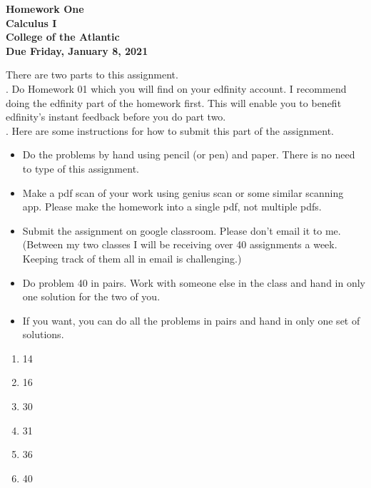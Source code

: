 \documentclass[12pt]{article}
\begin{document}
\pagestyle{empty}
 
\begin{center}
{\LARGE {\bf Homework One}}\\
\bigskip
{\Large {\bf Calculus I}}\\
\bigskip
{\Large {\bf College of the Atlantic}}\\
\bigskip
{ {\bf Due Friday, January 8, 2021}}\\ 
\end{center}
\medskip


\noindent There are two parts to this assignment.\\

.  Do Homework 01 which you will find
on your edfinity account.  I recommend doing the edfinity part of the
homework first.  This will enable you to benefit edfinity's instant
feedback before you do part two.\\

.  Here are some
instructions for how to submit this part of the assignment.
\begin{itemize}
\item Do the problems by hand using pencil (or pen) and paper.
  There is no need to type of this assignment.
\item Make a pdf scan of your work using genius scan or some
  similar scanning app.  Please make the homework into a single
  pdf, not multiple pdfs.
\item Submit the assignment on google classroom.  Please don't
  email it to me.  (Between my two classes I will be receiving
  over 40 assignments a week.  Keeping track of them all in email
  is challenging.)
\item Do problem 40 in pairs. Work with someone else in the class
  and hand in only one solution for the two of you.
\item If you want, you can do all the problems in pairs and hand
  in only one set of solutions.\\
\end{itemize}


\begin{enumerate}
\setlength{\itemsep}{-1mm}
  \item 14
  \item 16
  \item 30
  \item 31
  \item 36
  \item 40

\end{enumerate}
\end{document}
